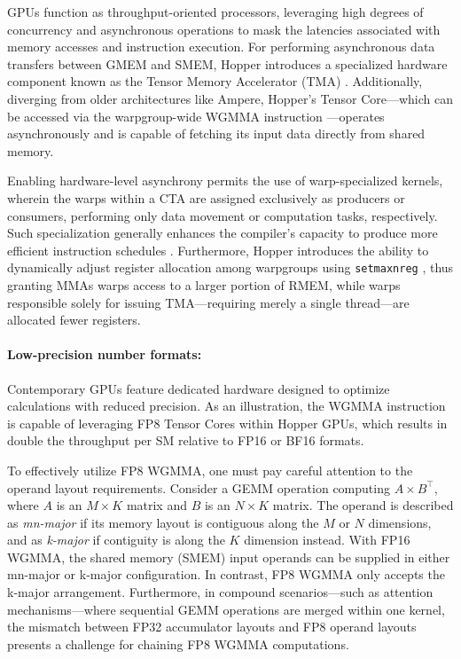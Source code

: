 GPUs function as throughput-oriented processors, leveraging high degrees of concurrency and asynchronous operations to mask the latencies associated with memory accesses and instruction execution. For performing asynchronous data transfers between GMEM and SMEM, Hopper introduces a specialized hardware component known as the Tensor Memory Accelerator (TMA) \cite[\S7.29]{cuda}. Additionally, diverging from older architectures like Ampere, Hopper’s Tensor Core—which can be accessed via the warpgroup-wide WGMMA instruction \cite[\S9.7.14]{ptx}—operates asynchronously and is capable of fetching its input data directly from shared memory.

Enabling hardware-level asynchrony permits the use of warp-specialized kernels, wherein the warps within a CTA are assigned exclusively as producers or consumers, performing only data movement or computation tasks, respectively. Such specialization generally enhances the compiler’s capacity to produce more efficient instruction schedules \citep{warp-specialization-2011}. Furthermore, Hopper introduces the ability to dynamically adjust register allocation among warpgroups using \verb|setmaxnreg| \cite[\S9.7.17.1]{ptx}, thus granting MMAs warps access to a larger portion of RMEM, while warps responsible solely for issuing TMA—requiring merely a single thread—are allocated fewer registers.

\paragraph{Low-precision number formats:}
\label{sec:low-precision-gpu}
Contemporary GPUs feature dedicated hardware designed to optimize calculations with reduced precision. As an illustration, the WGMMA instruction is capable of leveraging FP8 Tensor Cores within Hopper GPUs, which results in double the throughput per SM relative to FP16 or BF16 formats.

To effectively utilize FP8 WGMMA, one must pay careful attention to the operand layout requirements. Consider a GEMM operation computing $A \times B^{\top}$, where $A$ is an $M\times K$ matrix and $B$ is an $N\times K$ matrix. The operand is described as \emph{mn-major} if its memory layout is contiguous along the $M$ or $N$ dimensions, and as \emph{k-major} if contiguity is along the $K$ dimension instead. With FP16 WGMMA, the shared memory (SMEM) input operands can be supplied in either mn-major or k-major configuration. In contrast, FP8 WGMMA only accepts the k-major arrangement. Furthermore, in compound scenarios—such as attention mechanisms—where sequential GEMM operations are merged within one kernel, the mismatch between FP32 accumulator layouts and FP8 operand layouts presents a challenge for chaining FP8 WGMMA computations.

